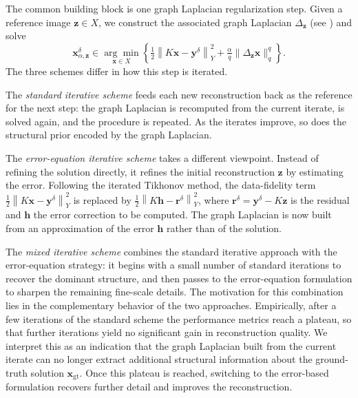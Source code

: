 \documentclass{article}
\theoremstyle{remark}
\newcommand{\gt}{\bm{x}_{\mathrm{gt}}}
\newcommand{\norm}[1]{\left\lVert #1 \right\rVert}
\newcommand{\bx}{{\bm{x}}}
\newcommand{\by}{{\bm{y}}}
\newcommand{\bz}{{\bm{z}}}
\newcommand{\bh}{{\bm{h}}}
\newcommand{\br}{{\bm{r}}}
\begin{document}
The common building block is one graph Laplacian regularization step. Given a
reference image $\bz\in X$, we construct the associated graph Laplacian
$\Delta_{\bz}$ (see ) and solve
\begin{equation}\label{eq:graphLa+}
\bx_{\alpha,\bz}^{\delta} \in
\underset{\bx \in X}{\arg\min}
\left\{
\tfrac{1}{2}\norm{K\bx - \by^\delta}_Y^2
+ \tfrac{\alpha}{q}\|\Delta_{\bz}\bx\|_q^q
\right\}.
\end{equation}
The three schemes differ in how this step is iterated.

The \emph{standard iterative scheme} feeds each new reconstruction back as the
reference for the next step: the graph Laplacian is recomputed from the current
iterate,  is solved again, and the procedure is repeated. As
the iterates improve, so does the structural prior encoded by the graph
Laplacian.

The \emph{error-equation iterative scheme} takes a different viewpoint. Instead
of refining the solution directly, it refines the initial reconstruction $\bz$
by estimating the error. Following the iterated Tikhonov method, the
data-fidelity term $\tfrac12\norm{K\bx-\by^\delta}_Y^2$ is replaced by
$\tfrac12\norm{K\bh-\br^\delta}_Y^2$, where $\br^\delta=\by^\delta-K\bz$ is the
residual and $\bh$ the error correction to be computed. The graph Laplacian is now built from an approximation of the error $\bh$
rather than of the solution.

The \emph{mixed iterative scheme} combines the standard iterative approach with the
error-equation strategy: it begins with a small number of standard iterations to
recover the dominant structure, and then passes to the error-equation
formulation to sharpen the remaining fine-scale details. The motivation for this
combination lies in the complementary behavior of the two approaches.
Empirically, after a few iterations of the standard scheme the performance
metrics reach a plateau, so that further iterations yield no significant gain in
reconstruction quality. We interpret this as an indication that the graph
Laplacian built from the current iterate can no longer extract additional
structural information about the ground-truth solution $\gt$. Once this plateau
is reached, switching to the error-based formulation recovers further detail and
improves the reconstruction.
\end{document}
